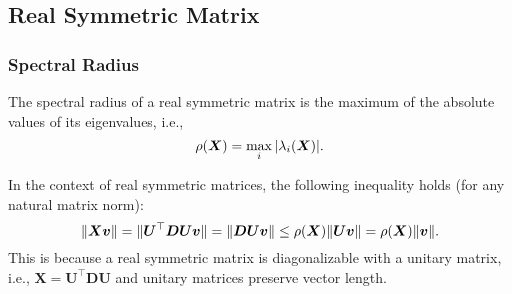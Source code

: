 


\subsection{Real Symmetric Matrix}
    \subsubsection{Spectral Radius}
    The spectral radius of a real symmetric matrix is the maximum of the absolute values of  its eigenvalues, i.e., 
        \begin{equation}
            \rho(\bm{X}) = \max_{i} | \lambda_i(\bm{X}) |.
        \end{equation}

    In the context of real symmetric matrices, the following inequality holds (for any natural matrix norm):
        \begin{equation}
            \lVert\bm{X}\bm{v}\rVert = \lVert\bm{U}^\top \bm{D} \bm{U} \bm{v}\rVert = \lVert\bm{D} \bm{U} \bm{v} \rVert \le \rho(\bm{X}) \lVert\bm{U} \bm{v}\rVert = \rho(\bm{X}) \lVert\bm{v}\rVert.
        \end{equation}
    This is because a real symmetric matrix is diagonalizable with a unitary matrix, i.e., $\bm{X} = \bm{U}^\top \bm{D} \bm{U}$ and unitary matrices preserve vector length.  
        